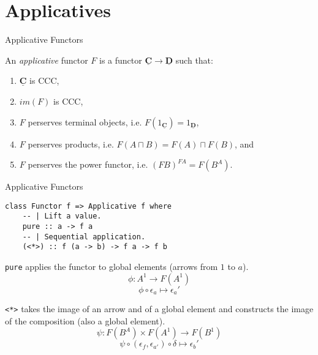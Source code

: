 \documentclass[10pt]{beamer}
\newcommand{\Cat}[1]{\ensuremath{\underline{\mathbf{#1}}}}
\newcommand{\Com}[3]{#3^{#2}}
\theoremstyle{definition}
\theoremstyle{remark}
\numberwithin{equation}{section}
\begin{document}

\section{Applicatives}

\begin{frame}[fragile]{Applicative Functors}

  An \emph{applicative} functor $F$ is a functor $\Cat{C}\rightarrow \Cat{D}$ such that:
  \begin{enumerate}
    \item $\Cat{C}$ is CCC,
    \item $im(F)$ is CCC,
    \item $F$ perserves terminal objects, i.e. $F(1_{\Cat{C}})=1_{\Cat{D}}$,
    \item $F$ perserves products, i.e. $F(A\sqcap B)=F(A)\sqcap F(B)$, and
    \item $F$ perserves the power functor, i.e. $\Com{D}{F A}{(F B)} = F (\Com{C}{A}{B})$.
  \end{enumerate}

\end{frame}

\begin{frame}[fragile]{Applicative Functors}

  \begin{lstlisting}[frame=single]
class Functor f => Applicative f where
    -- | Lift a value.
    pure :: a -> f a
    -- | Sequential application.
    (<*>) :: f (a -> b) -> f a -> f b
  \end{lstlisting}

  \lstinline{pure} applies the functor to global elements (arrows from $1$ to $a$).
  \[
  \phi : \Com{Hask}{1}{A} \rightarrow F(\Com{Hask}{1}{A})
  \]
  \[
  \phi \circ \epsilon_a \mapsto \epsilon_a'
  \]

  \lstinline{<*>} takes the image of an arrow and of a global element and constructs the image of the composition (also a global element).
  \[
  \psi : F (\Com{Hask}{A}{B}) \times F(\Com{Hask}{1}{A}) \rightarrow F(\Com{Hask}{1}{B})
  \]
  \[
  \psi \circ (\epsilon_{f},\epsilon_{a'}) \circ \delta \mapsto \epsilon_b'
  \]

\end{frame}
\end{document}

